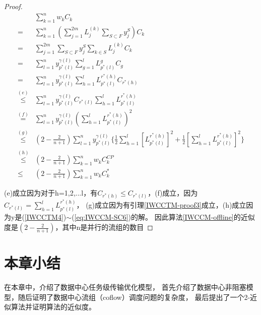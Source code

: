\begin{proof}
\begin{align}\label{proof_optimization}
&\sum_{k=1}^{n} w_{k} C_{k}\nonumber \\
=&\sum_{k=1}^{n} (\sum_{j=1}^{2m} L_{j}^{(k)} \sum_{S\subset F} y_j^S )C_{k}\nonumber \\
=&\sum_{j=1}^{2m} \sum_{S\subset F} y_j^S\sum_{k \in S}L_{j}^{(k)}C_k \nonumber \\
=&\sum_{l=1}^{n} y_{p^*(l)}^{\gamma(l)}\sum_{g=1}^{l} L_{p^*(l)}^{g}C_g\nonumber \\
=&\sum_{l=1}^{n} y_{p^*(l)}^{\gamma(l)}\sum_{h=1}^{l} L_{p^*(l)}^{r^*(h)}C_{r^*(h)}\nonumber \\
\overset{(e)}{\leq} &\sum_{l=1}^{n} y_{p^*(l)}^{\gamma(l)}C_{r^*(l)}\sum_{h=1}^{l} L_{p^*(l)}^{r^*(h)}\nonumber \\
\overset{(f)}{=} &\sum_{l=1}^{n} y_{p^*(l)}^{\gamma(l)}(\sum_{h=1}^{l} L_{p^*(l)}^{r^*(h)})^2\nonumber \\
\overset{(g)}{\leq}& (2-\frac{2}{n+1})\sum_{l=1}^{n}y_{p^*(l)}^{\gamma(l)}\{ \frac{1}{2}\sum_{h=1}^{l} \left[L_{p^*(l)}^{r^*(h)}\right]^2+ \frac{1}{2}\left[\sum_{h=1}^{l} L_{p^*(l)}^{r^*(h)}\right]^2 \}\nonumber \\
\overset{(h)}{\leq}& (2-\frac{2}{n+1}) \sum_{k=1}^{n} w_{k} C_{k}^{CP} \nonumber \\
\leq& (2-\frac{2}{n+1}) \sum_{k=1}^{n} w_{k} C_{k}^{*} 
\end{align}

(e)成立因为对于h=1,2,...l，有$C_{r^*(h)}\leq C_{r^*(l)} $，(f)成立，因为$C_{r^*(l)}=\sum_{h=1}^{l} L_{p^*(l)}^{r^*(h)}$，
(g)成立因为有引理\ref{IWCCTM-proof3}成立，(h)成立因为y是(\ref{IWCCTM4})$\sim$(\ref{eq:IWCCM-SC6})的解。
因此算法\ref{IWCCM-offline}的近似度是$(2-\frac{2}{n+1})$，其中n是并行的流组的数目
\end{proof}

\section{本章小结}
在本章中，介绍了数据中心任务级传输优化模型，
首先介绍了数据中心非阻塞模型，随后证明了数据中心流组（coflow）调度问题的复杂度，
最后提出了一个2-近似算法并证明算法的近似度。